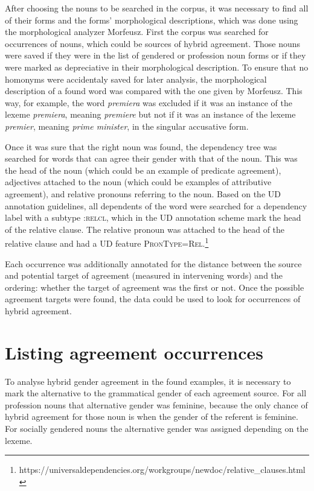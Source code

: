 After choosing the nouns to be searched in the corpus, it was necessary to find all of their forms and the forms' morphological descriptions, which was done using the morphological analyzer Morfeusz. First the corpus was searched for occurrences of nouns, which could be sources of hybrid agreement. Those nouns were saved if they were in the list of gendered or profession noun forms or if they were marked as depreciative in their morphological description. To ensure that no homonyms were accidentaly saved for later analysis, the morphological description of a found word was compared with the one given by Morfeusz. This way, for example, the word \textsl{premiera} was excluded if it was an instance of the lexeme \textsl{premiera}, meaning \textsl{premiere} but not if it was an instance of the lexeme \textsl{premier}, meaning \textsl{prime minister}, in the singular accusative form.

Once it was sure that the right noun was found, the dependency tree was searched for words that can agree their gender with that of the noun. This was the head of the noun (which could be an example of predicate agreement), adjectives attached to the noun (which could be examples of attributive agreement), and relative pronouns referring to the noun. Based on the UD annotation guidelines, all dependents of the word were searched for a dependency label with a subtype \textsc{:relcl}, which in the UD annotation scheme mark the head of the relative clause. The relative pronoun was attached to the head of the relative clause and had a UD feature \textsc{PronType=Rel}.\footnote{https://universaldependencies.org/workgroups/newdoc/relative\_clauses.html}

Each occurrence was additionally annotated for the distance between the source and potential target of agreement (measured in intervening words) and the ordering: whether the target of agreement was the first or not. Once the possible agreement targets were found, the data could be used to look for occurrences of hybrid agreement.

\section{Listing agreement occurrences}
To analyse hybrid gender agreement in the found examples, it is necessary to mark the alternative to the grammatical gender of each agreement source. For all profession nouns that alternative gender was feminine, because the only chance of hybrid agreement for those noun is when the gender of the referent is feminine. For socially gendered nouns the alternative gender was assigned depending on the lexeme.

